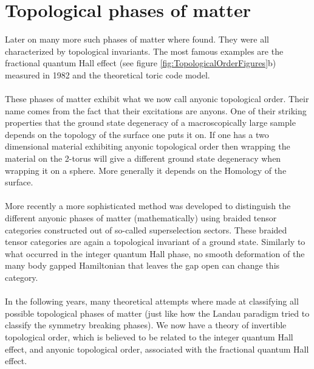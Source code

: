 \section{Topological phases of matter}
Later on many more such phases of matter where found. They were all characterized by topological invariants. The most famous examples are the fractional quantum Hall effect (see figure \ref{fig:TopologicalOrderFigures}b) measured in 1982 and the theoretical toric code model.
\\\\
These phases of matter exhibit what we now call anyonic topological order. Their name comes from the fact that their excitations are anyons. One of their striking properties that the ground state degeneracy of a macroscopically large sample depends on the topology of the surface one puts it on. If one has a two dimensional material exhibiting anyonic topological order then wrapping the material on the 2-torus will give a different ground state degeneracy when wrapping it on a sphere. More generally it depends on the Homology of the surface.
\\\\
More recently a more sophisticated method was developed to distinguish the different anyonic phases of matter (mathematically) using braided tensor categories constructed out of so-called superselection sectors. These braided tensor categories are again a topological invariant of a ground state. Similarly to what occurred in the integer quantum Hall phase, no smooth deformation of the many body gapped Hamiltonian that leaves the gap open can change this category.
\\\\
In the following years, many theoretical attempts where made at classifying all possible topological phases of matter (just like how the Landau paradigm tried to classify the symmetry breaking phases). We now have a theory of invertible topological order, which is believed to be related to the integer quantum Hall effect, and anyonic topological order, associated with the fractional quantum Hall effect.
